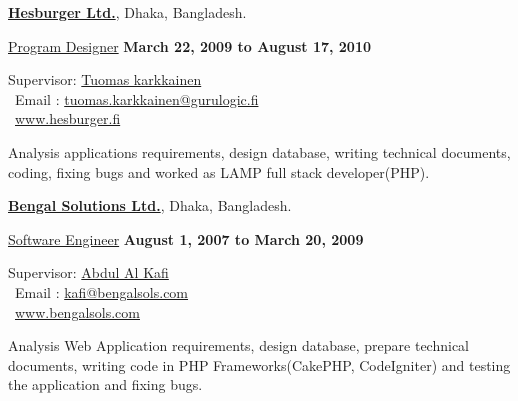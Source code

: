 \documentclass[10pt,a4paper]{article}
\renewcommand\textit[1]{\underline{#1}}
\newcommand{\halfblankline}{\quad\vspace{-0.5\baselineskip}\pagebreak[3]}
\begin{document}
\href{www.hesburger.fi}{\textbf{Hesburger Ltd.}},
Dhaka, Bangladesh.
\begin{outerlist}

    \item[] \textit{Program Designer}%
            \hfill \textbf{March 22, 2009 to August 17, 2010}
            \begin{innerlist}
                \item Supervisor:
                        \href{http://fi.linkedin.com/pub/tuomas-karkkainen/4a/586/113}%
                           {Tuomas karkkainen}\\
					 \Email~Email : \href{mailto:tuomas.karkkainen@gurulogic.fi}{tuomas.karkkainen@gurulogic.fi}\\
    				\Mundus~\url{www.hesburger.fi}
                \item Analysis applications requirements, design database,
                writing technical documents, coding, fixing bugs and worked as LAMP full stack developer(PHP).
               
            \end{innerlist}

\end{outerlist}

\halfblankline

\href{www.bengalsols.com}{\textbf{Bengal Solutions Ltd.}},
Dhaka, Bangladesh.
\begin{outerlist}

    \item[] \textit{Software Engineer}%
            \hfill \textbf{August 1, 2007 to March 20, 2009}
            \begin{innerlist}
                \item Supervisor:
                        \href{http://bd.linkedin.com/in/mkafi}%
                             {Abdul Al Kafi}\\
					 \Email~Email : \href{mailto:kafi@bengalsols.com }{kafi@bengalsols.com}\\
    				\Mundus~\url{www.bengalsols.com}
                \item Analysis Web Application requirements, design database,
                prepare technical documents, writing code in PHP
                Frameworks(CakePHP, CodeIgniter) and testing the application and
                fixing bugs.
               
            \end{innerlist}

\end{outerlist}
\end{document}
